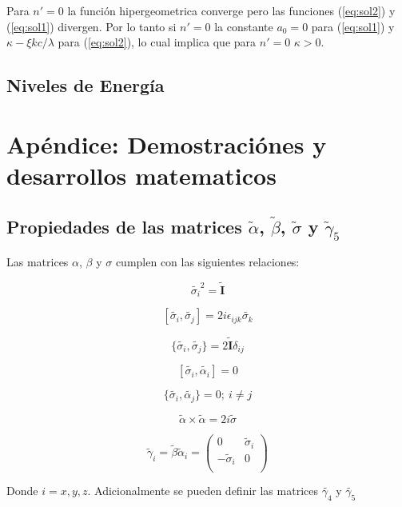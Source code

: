\documentclass[a4paper, 12pt]{article} %
\begin{document}
Para $n' = 0$ la funci\'on hipergeometrica converge pero las funciones (\ref{eq:sol2}) y (\ref{eq:sol1})
divergen. Por lo tanto si $n'=0$ la constante $a_0 = 0$ para (\ref{eq:sol1}) y $\kappa - \xi kc / \lambda$
para (\ref{eq:sol2}), lo cual implica que para $n'=0$ $\kappa > 0$. 

\subsection{Niveles de Energ\'ia}


\section{Ap\'endice: Demostraci\'ones y desarrollos matematicos}\label{sec:apendice}

\subsection{Propiedades de las matrices $\widetilde{\alpha}$, $\widetilde{\beta}$,  
$\widetilde{\sigma}$ y $\widetilde{\gamma}_5$}\label{sec:gamma5}

Las matrices $\alpha$, $\beta$ y $\sigma$ cumplen con las siguientes relaciones:

\[
\widetilde{\sigma_i}^2 = \widetilde{\mathbf{I}}
\]

\[
[\widetilde{\sigma_i}, \widetilde{\sigma_j}] = 2i\epsilon_{ijk}\widetilde{\sigma_k}
\]

\[
\{\widetilde{\sigma_i},\widetilde{\sigma_j}\} = 2\widetilde{\mathbf{I}}\delta_{ij}
\]

\[
[\widetilde{\sigma_i}, \widetilde{\alpha_i}] = 0
\]

\[
\{ \widetilde{\sigma_i}, \widetilde{\alpha_j} \} = 0;  \ i \neq j
\]

\[
\widetilde{\alpha} \times \widetilde{\alpha} = 2i\widetilde{\sigma}
\]

\[
\widetilde{\gamma}_i = \widetilde{\beta}\widetilde{\alpha}_i = 
\begin{pmatrix}
0 & \widetilde{\sigma}_i \\
-\widetilde{\sigma}_i & 0 \\
\end{pmatrix}
\]

Donde $i = x, y, z$. Adicionalmente se pueden definir las matrices $\widetilde{\gamma_4}$ y $\widetilde{\gamma_5}$
\end{document}
